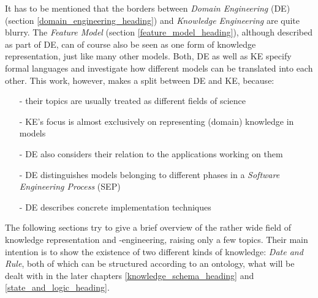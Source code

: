 It has to be mentioned that the borders between \emph{Domain Engineering} (DE)
(section \ref{domain_engineering_heading}) and \emph{Knowledge Engineering} are
quite blurry. The \emph{Feature Model} (section \ref{feature_model_heading}),
although described as part of DE, can of course also be seen as one form of
knowledge representation, just like many other models. Both, DE as well as KE
specify formal languages and investigate how different models can be translated
into each other. This work, however, makes a split between DE and KE, because:

\begin{itemize}
    \item[-] their topics are usually treated as different fields of science
    \item[-] KE's focus is almost exclusively on representing (domain)
        knowledge in models
    \item[-] DE also considers their relation to the applications working on
        them
    \item[-] DE distinguishes models belonging to different phases in a
        \emph{Software Engineering Process} (SEP)
    \item[-] DE describes concrete implementation techniques
\end{itemize}

The following sections try to give a brief overview of the rather wide field of
knowledge representation and -engineering, raising only a few topics. Their
main intention is to show the existence of two different kinds of knowledge:
\emph{Date and Rule}, both of which can be structured according to an ontology,
what will be dealt with in the later chapters \ref{knowledge_schema_heading}
and \ref{state_and_logic_heading}.

%


%
%


%
